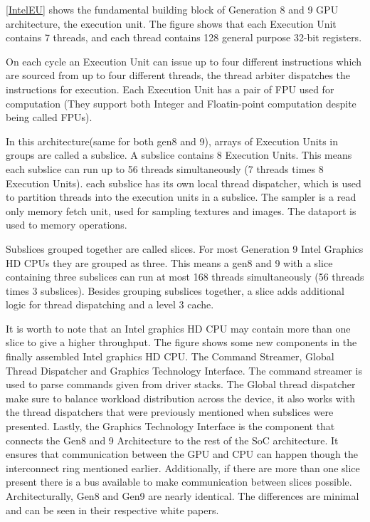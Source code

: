 
\ref{IntelEU} shows the fundamental building block of Generation 8 and 9 \gls{GPU} architecture, the execution unit. 
The figure shows that each Execution Unit contains 7 threads, and each thread contains 128 general purpose 32-bit registers.  

On each cycle an Execution Unit can issue up to four different instructions which are sourced from up to four different threads, the thread arbiter dispatches the instructions for execution.
Each Execution Unit has a pair of \gls{FPU} used for computation (They support both Integer and Floatin-point computation despite being called FPUs).

In this architecture(same for both gen8 and 9), arrays of Execution Units in groups are called a subslice. A subslice contains 8 Execution Units. 
This means each subslice can run up to 56 threads simultaneously (7 threads times 8 Execution Units). 
each subslice has its own local thread dispatcher, which is used to partition threads into the execution units in a subslice.
The sampler is a read only memory fetch unit, used for sampling textures and images.
The dataport is used to memory operations.

Subslices grouped together are called slices. For most Generation 9 Intel Graphics HD \glspl{CPU} they are grouped as three.
This means a gen8 and 9 with a slice containing three subslices can run at most 168 threads simultaneously (56 threads times 3 subslices).
Besides grouping subslices together, a slice adds additional logic for thread dispatching and a level 3 cache.

It is worth to note that an Intel graphics HD \gls{CPU} may contain more than one slice to give a higher throughput.
The figure shows some new components in the finally assembled Intel graphics HD \gls{CPU}. The Command Streamer, Global Thread Dispatcher and Graphics Technology Interface.
The command streamer is used to parse commands given from driver stacks. 
The Global thread dispatcher make sure to balance workload distribution across the device, it also works with the thread dispatchers that were previously mentioned when subslices were presented.
Lastly, the Graphics Technology Interface is the component that connects the Gen8 and 9 Architecture to the rest of the SoC architecture. 
It ensures that communication between the \gls{GPU} and \gls{CPU} can happen though the interconnect ring mentioned earlier.  
Additionally, if there are more than one slice present there is a bus available to make communication between slices possible. 
Architecturally, Gen8 \cite{computegen8} and Gen9 \cite{computegen9} are nearly identical. The differences are minimal and can be seen in their respective white papers. 

